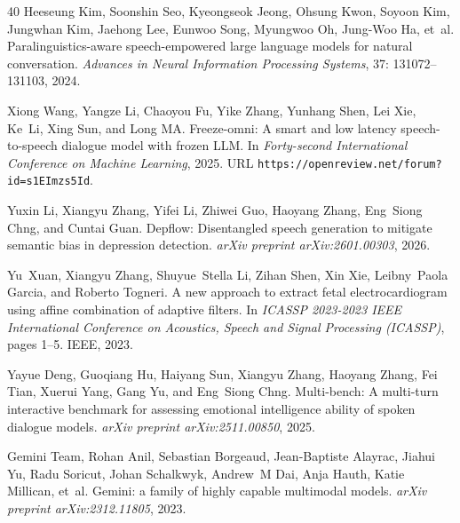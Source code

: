 \documentclass{llmxive}
\providecommand{\url}[1]{\texttt{#1}}
\begin{document}
\begin{thebibliography}{40}
Heeseung Kim, Soonshin Seo, Kyeongseok Jeong, Ohsung Kwon, Soyoon Kim, Jungwhan Kim, Jaehong Lee, Eunwoo Song, Myungwoo Oh, Jung-Woo Ha, et~al.
\newblock Paralinguistics-aware speech-empowered large language models for natural conversation.
\newblock \emph{Advances in Neural Information Processing Systems}, 37: 131072--131103, 2024.

Xiong Wang, Yangze Li, Chaoyou Fu, Yike Zhang, Yunhang Shen, Lei Xie, Ke~Li, Xing Sun, and Long MA.
\newblock Freeze-omni: A smart and low latency speech-to-speech dialogue model with frozen {LLM}.
\newblock In \emph{Forty-second International Conference on Machine Learning}, 2025.
\newblock URL \url{https://openreview.net/forum?id=s1EImzs5Id}.

Yuxin Li, Xiangyu Zhang, Yifei Li, Zhiwei Guo, Haoyang Zhang, Eng~Siong Chng, and Cuntai Guan.
\newblock Depflow: Disentangled speech generation to mitigate semantic bias in depression detection.
\newblock \emph{arXiv preprint arXiv:2601.00303}, 2026.

Yu~Xuan, Xiangyu Zhang, Shuyue~Stella Li, Zihan Shen, Xin Xie, Leibny~Paola Garcia, and Roberto Togneri.
\newblock A new approach to extract fetal electrocardiogram using affine combination of adaptive filters.
\newblock In \emph{ICASSP 2023-2023 IEEE International Conference on Acoustics, Speech and Signal Processing (ICASSP)}, pages 1--5. IEEE, 2023.

Yayue Deng, Guoqiang Hu, Haiyang Sun, Xiangyu Zhang, Haoyang Zhang, Fei Tian, Xuerui Yang, Gang Yu, and Eng~Siong Chng.
\newblock Multi-bench: A multi-turn interactive benchmark for assessing emotional intelligence ability of spoken dialogue models.
\newblock \emph{arXiv preprint arXiv:2511.00850}, 2025.

Gemini Team, Rohan Anil, Sebastian Borgeaud, Jean-Baptiste Alayrac, Jiahui Yu, Radu Soricut, Johan Schalkwyk, Andrew~M Dai, Anja Hauth, Katie Millican, et~al.
\newblock Gemini: a family of highly capable multimodal models.
\newblock \emph{arXiv preprint arXiv:2312.11805}, 2023.


\end{thebibliography}
\end{document}
